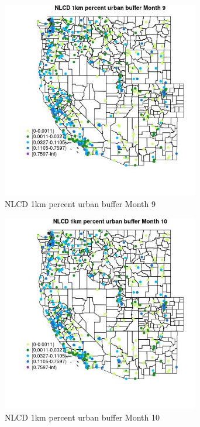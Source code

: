 \begin{figure} 
\centering  
\includegraphics[width=0.77\textwidth]{Code_Outputs/Report_ML_input_PM25_Step4_part_e_de_duplicated_aves_compiled_2019-05-14wNAs_MapObsMo9NLCD_1km_percent_urban_buffer.jpg} 
\caption{\label{fig:Report_ML_input_PM25_Step4_part_e_de_duplicated_aves_compiled_2019-05-14wNAsMapObsMo9NLCD_1km_percent_urban_buffer}NLCD 1km percent urban buffer Month 9} 
\end{figure} 
 

\begin{figure} 
\centering  
\includegraphics[width=0.77\textwidth]{Code_Outputs/Report_ML_input_PM25_Step4_part_e_de_duplicated_aves_compiled_2019-05-14wNAs_MapObsMo10NLCD_1km_percent_urban_buffer.jpg} 
\caption{\label{fig:Report_ML_input_PM25_Step4_part_e_de_duplicated_aves_compiled_2019-05-14wNAsMapObsMo10NLCD_1km_percent_urban_buffer}NLCD 1km percent urban buffer Month 10} 
\end{figure} 
 

